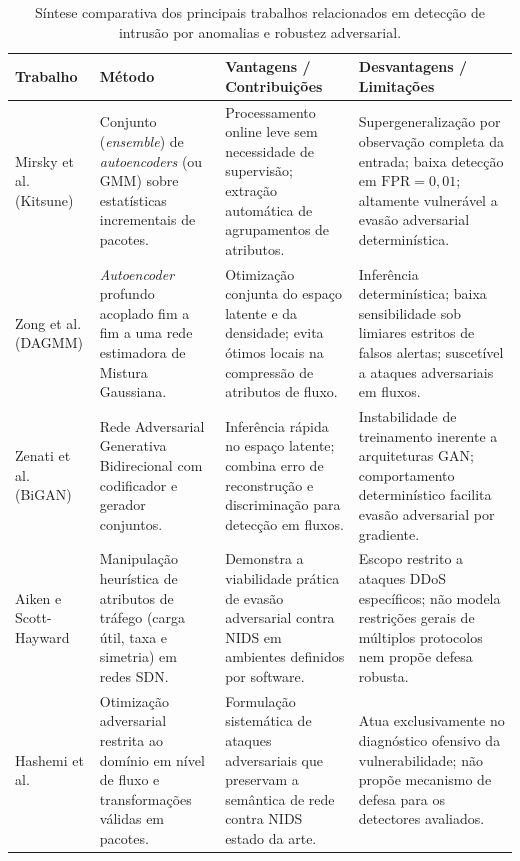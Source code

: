 \documentclass[conference]{IEEEtran}
\begin{document}
\begin{table}[!t]
\centering
\caption{Síntese comparativa dos principais trabalhos relacionados em detecção de intrusão por anomalias e robustez adversarial.}
\label{tab:trabalhos-relacionados}
\begin{tabular}{@{}>{\raggedright\arraybackslash}p{2.8cm}>{\raggedright\arraybackslash}p{3.6cm}>{\raggedright\arraybackslash}p{5.2cm}>{\raggedright\arraybackslash}p{5.2cm}@{}}
\toprule
\textbf{Trabalho} & \textbf{Método} & \textbf{Vantagens / Contribuições} & \textbf{Desvantagens / Limitações} \\
\midrule
Mirsky et al. (Kitsune) \cite{mirsky2018} & Conjunto (\textit{ensemble}) de \textit{autoencoders} (ou GMM) sobre estatísticas incrementais de pacotes. & Processamento online leve sem necessidade de supervisão; extração automática de agrupamentos de atributos. & Supergeneralização por observação completa da entrada; baixa detecção em $\text{FPR}=0{,}01$; altamente vulnerável a evasão adversarial determinística. \\
\addlinespace
Zong et al. (DAGMM) \cite{zong2018} & \textit{Autoencoder} profundo acoplado fim a fim a uma rede estimadora de Mistura Gaussiana. & Otimização conjunta do espaço latente e da densidade; evita ótimos locais na compressão de atributos de fluxo. & Inferência determinística; baixa sensibilidade sob limiares estritos de falsos alertas; suscetível a ataques adversariais em fluxos. \\
\addlinespace
Zenati et al. (BiGAN) \cite{zenati2018} & Rede Adversarial Generativa Bidirecional com codificador e gerador conjuntos. & Inferência rápida no espaço latente; combina erro de reconstrução e discriminação para detecção em fluxos. & Instabilidade de treinamento inerente a arquiteturas GAN; comportamento determinístico facilita evasão adversarial por gradiente. \\
\addlinespace
Aiken e Scott-Hayward \cite{aiken2019} & Manipulação heurística de atributos de tráfego (carga útil, taxa e simetria) em redes SDN. & Demonstra a viabilidade prática de evasão adversarial contra NIDS em ambientes definidos por software. & Escopo restrito a ataques DDoS específicos; não modela restrições gerais de múltiplos protocolos nem propõe defesa robusta. \\
\addlinespace
Hashemi et al. \cite{hashemi2019} & Otimização adversarial restrita ao domínio em nível de fluxo e transformações válidas em pacotes. & Formulação sistemática de ataques adversariais que preservam a semântica de rede contra NIDS estado da arte. & Atua exclusivamente no diagnóstico ofensivo da vulnerabilidade; não propõe mecanismo de defesa para os detectores avaliados. \\

\end{tabular}
\end{table}
\end{document}
